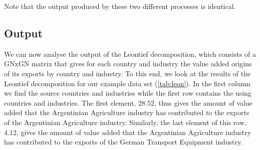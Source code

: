 \documentclass[a4paper]{article}\usepackage[]{graphicx}\usepackage[]{color}
\begin{document}
Note that the output produced by these two different processes is identical.

\subsection{Output}
We can now analyse the output of the Leontief decomposition, which consists of a GNxGN matrix that gives for each country and industry the
value added origins of its exports by country and industry.
To this end, we look at the results of the Leontief decomposition for our example data set (\cref{tab:leon}).
In the first column we find the source countries and industries while the first row contains the using countries and industries.
The first element, $28.52$, thus gives the amount of value added that the Argentinian Agriculture industry has contributed to the exports of the Argentinian Agriculture industry.
Similarly, the last element of this row, $4.12$, gives the amount of value added that the Argentinian Agriculture industry has contributed 
to the exports of the German Transport Equipment industry.
\end{document}
